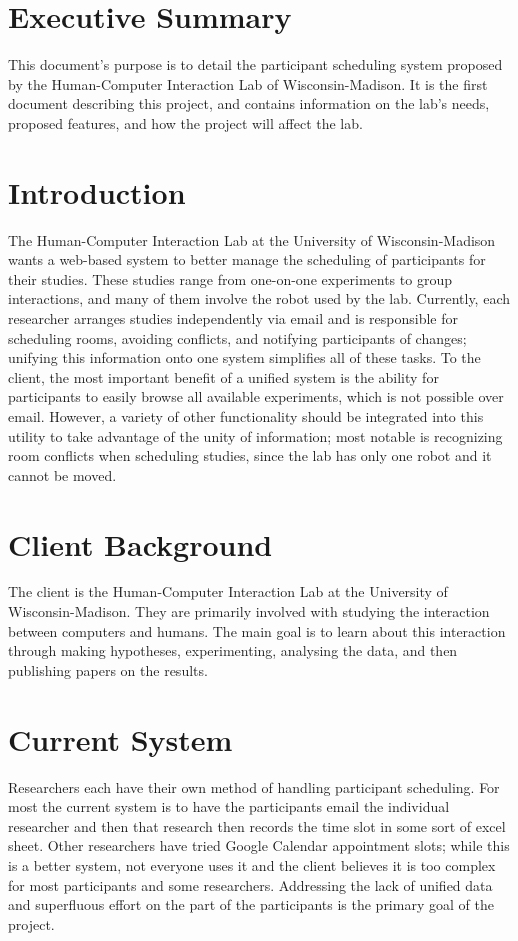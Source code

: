 \tableofcontents
\newpage

\section{Executive Summary}
This document's purpose is to detail the participant scheduling system proposed by the Human-Computer Interaction Lab of Wisconsin-Madison. It is the first document describing this project, and contains information on the lab's needs, proposed features, and how the project will affect the lab.

\section{Introduction}
The Human-Computer Interaction Lab at the University of Wisconsin-Madison wants a web-based system to better manage the scheduling of participants for their studies.  These studies range from one-on-one experiments to group interactions, and many of them involve the robot used by the lab.  Currently, each researcher arranges studies independently via email and is responsible for scheduling rooms, avoiding conflicts, and notifying participants of changes; unifying this information onto one system simplifies all of these tasks.  To the client, the most important benefit of a unified system is the ability for participants to easily browse all available experiments, which is not possible over email.  However, a variety of other functionality should be integrated into this utility to take advantage of the unity of information; most notable is recognizing room conflicts when scheduling studies, since the lab has only one robot and it cannot be moved.

\section{Client Background}
The client is the Human-Computer Interaction Lab at the University of Wisconsin-Madison. They are primarily involved with studying the interaction between computers and humans. The main goal is to learn about this interaction through making hypotheses, experimenting, analysing the data, and then publishing papers on the results.

\section{Current System}
Researchers each have their own method of handling participant scheduling. For most the current system is to have the participants email the individual researcher and then that research then records the time slot in some sort of excel sheet. Other researchers have tried Google Calendar appointment slots; while this is a better system, not everyone uses it and the client believes it is too complex for most participants and some researchers.  Addressing the lack of unified data and superfluous effort on the part of the participants is the primary goal of the project.

